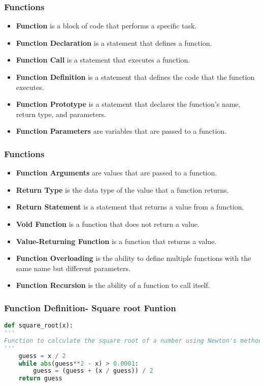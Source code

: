 \begin{frame}
    \frametitle{Functions}
\begin{itemize}
    \item \textbf{Function} is a block of code that performs a specific task.
    \item \textbf{Function Declaration} is a statement that defines a function.
    \item \textbf{Function Call} is a statement that executes a function.
    \item \textbf{Function Definition} is a statement that defines the code that the function executes.
    \item \textbf{Function Prototype} is a statement that declares the function's name, return type, and parameters.
    \item \textbf{Function Parameters} are variables that are passed to a function.
\end{itemize}
\end{frame}
    
\begin{frame}
    \frametitle{Functions}
    \begin{itemize}
    \item \textbf{Function Arguments} are values that are passed to a function.
    \item \textbf{Return Type} is the data type of the value that a function returns.
    \item \textbf{Return Statement} is a statement that returns a value from a function.
    \item \textbf{Void Function} is a function that does not return a value.
    \item \textbf{Value-Returning Function} is a function that returns a value.
    \item \textbf{Function Overloading} is the ability to define multiple functions with the same name but different parameters.
    \item \textbf{Function Recursion} is the ability of a function to call itself.
    \end{itemize}
\end{frame}

\begin{frame}[fragile]
    \frametitle{Function Definition- Square root Funtion }
    \begin{lstlisting}[style=colorful, language=Python]
def square_root(x):
'''
Function to calculate the square root of a number using Newton's method
'''
    guess = x / 2
    while abs(guess**2 - x) > 0.0001:
        guess = (guess + (x / guess)) / 2
    return guess
    \end{lstlisting}
\end{frame}